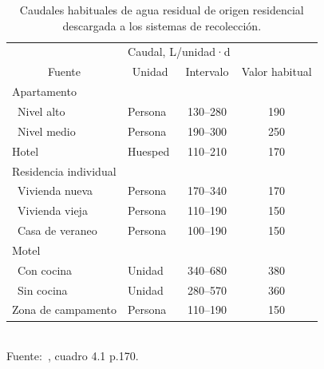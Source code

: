 \begin{table}[!ht]
	\centering
	\caption{Caudales habituales de agua residual de origen residencial descargada a los sistemas de recolección.}
	\label{tab:Qhabituales}
	\begin{tabular}{llcc}
		\noalign{\hrule height 3pt}
		\multicolumn{2}{c}{}                                    & \multicolumn{2}{c}{Caudal, L/unidad·d} \\ \cline{3-4} 
		\multicolumn{1}{c}{Fuente} & \multicolumn{1}{c}{Unidad} & Intervalo       & Valor habitual       \\ \hline
		Apartamento                &                            &                 &                      \\
		\space~Nivel alto                 & Persona                    & 130--280        & 190                  \\
		\space~Nivel medio                & Persona                    & 190--300        & 250                  \\
		Hotel                      & Huesped                    & 110--210        & 170                  \\
		Residencia individual      &                            &                 &                      \\
		\space~Vivienda nueva             & Persona                    & 170--340        & 170                  \\
		\space~Vivienda vieja             & Persona                    & 110--190        & 150                  \\
		\space~Casa de veraneo            & Persona                    & 100--190        & 150                  \\
		Motel                      &                            &                 &                      \\
		\space~Con cocina                 & Unidad                     & 340--680        & 380                  \\
		\space~Sin cocina                 & Unidad                     & 280--570        & 360                  \\
		Zona de campamento         & Persona                    & 110--190        & 150                  \\ \hline
	\end{tabular}
	\\\small{Fuente:~\cite{crites2000}, cuadro 4.1 p.170.}
\end{table}
